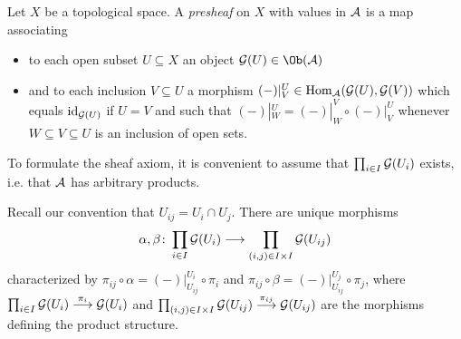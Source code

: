 \documentclass[a4paper,parskip=half,numbers=enddot, DIV=12]{scrreprt}
\begin{document}
	Let $X$ be a topological space. A \emph{presheaf} on $X$ with values in $\mathcal{A}$ is a map associating
	\begin{itemize}
		\item to each open subset $U\subseteq X$ an object $\Gg(U)\in\Ob(\Aa)$
		\item and to each inclusion $V\subseteq U$ a morphism $(-)|_V^U\in\operatorname{Hom}_{\mathcal{A}}(\mathcal{G}(U), \mathcal{G}(V))$ which equals $\operatorname{id}_{\mathcal{G}(U)}$ if $U=V$ and such that $(-)|_W^U=(-)|_W^V\circ(-)|_V^U$ whenever $W\subseteq V\subseteq U$ is an inclusion of open sets.
	\end{itemize}
	To formulate the sheaf axiom, it is convenient to assume that $\prod_{i\in I}\mathcal{G}(U_i)$ exists, i.e. that $\mathcal{A}$ has arbitrary products.
	
	Recall our convention that $U_{ij}=U_i\cap U_j$. There are unique morphisms
	\begin{align*}
		\alpha,\beta\colon \prod_{i\in I}\mathcal{G}(U_i)\longrightarrow\prod_{(i,j)\in I\times I}\mathcal{G}(U_{ij})
	\end{align*}
	characterized by $\pi_{ij}\circ\alpha=(-)|_{U_{ij}}^{U_i}\circ\pi_i$ and $\pi_{ij}\circ\beta=(-)|_{U_{ij}}^{U_j}\circ\pi_j$, where $\prod_{i\in I}\Gg(U_i)\morphism[\pi_i]\Gg(U_i)$ and $\prod_{(i,j)\in I\times I}\Gg(U_{ij})\morphism[\pi_{ij}]\Gg(U_{ij})$ are the morphisms defining the product structure.
	
\end{document}
